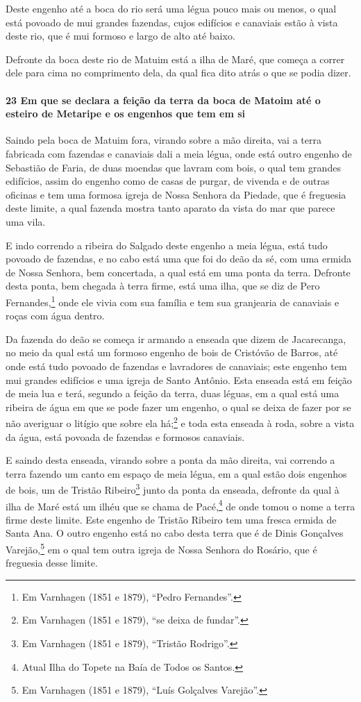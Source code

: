 Deste engenho até a boca do rio será uma légua pouco mais ou menos, o qual está povoado de
mui grandes fazendas, cujos edifícios e canaviais estão à vista deste rio, que é mui
formoso e largo de alto até baixo.

Defronte da boca deste rio de Matuim está a ilha de Maré, que começa a correr dele para
cima no comprimento dela, da qual fica dito atrás o que se podia dizer.

\paragraph{23 Em que se declara a feição da terra da boca de Matoim até o esteiro de
Metaripe e os engenhos que tem em si}

Saindo pela boca de Matuim fora, virando sobre a mão direita, vai a terra fabricada com
fazendas e canaviais dali a meia légua, onde está outro engenho de Sebastião de Faria, de
duas moendas que lavram com bois, o qual tem grandes edifícios, assim do engenho como de
casas de purgar, de vivenda e de outras oficinas e tem uma formosa igreja de Nossa Senhora
da Piedade, que é freguesia deste limite, a qual fazenda mostra tanto aparato da vista do
mar que parece uma vila.

E indo correndo a ribeira do Salgado deste engenho a meia légua, está tudo povoado de
fazendas, e no cabo está uma que foi do deão da sé, com uma ermida de Nossa Senhora, bem
concertada, a qual está em uma ponta da terra. Defronte desta ponta, bem chegada à terra
firme, está uma ilha, que se diz de Pero Fernandes,\footnote{ Em Varnhagen (1851 e 1879),
``Pedro Fernandes''.} onde ele vivia com sua família e tem sua granjearia de canaviais e
roças com água dentro.

Da fazenda do deão se começa ir armando a enseada que dizem de Jacarecanga, no meio da
qual está um formoso engenho de bois de Cristóvão de Barros, até onde está tudo povoado de
fazendas e lavradores de canaviais; este engenho tem mui grandes edifícios e uma igreja de
Santo Antônio. Esta enseada está em feição de meia lua e terá, segundo a feição da terra,
duas léguas, em a qual está uma ribeira de água em que se pode fazer um engenho, o qual se
deixa de fazer por se não averiguar o litígio que sobre ela há;\footnote{ Em Varnhagen
(1851 e 1879), ``se deixa de fundar''.} e toda esta enseada à roda, sobre a vista da água,
está povoada de fazendas e formosos canaviais.

E saindo desta enseada, virando sobre a ponta da mão direita, vai correndo a terra fazendo
um canto em espaço de meia légua, em a qual estão dois engenhos de bois, um de Tristão
Ribeiro\footnote{ Em Varnhagen (1851 e 1879), ``Tristão Rodrigo''.} junto da ponta da
enseada, defronte da qual à ilha de Maré está um ilhéu que se chama de Pacé,\footnote{
Atual Ilha do Topete na Baía de Todos os Santos.} de onde tomou o nome a terra firme deste
limite. Este engenho de Tristão Ribeiro tem uma fresca ermida de Santa Ana. O outro
engenho está no cabo desta terra que é de Dinis Gonçalves Varejão,\footnote{ Em Varnhagen
(1851 e 1879), ``Luís Golçalves Varejão''.} em o qual tem outra igreja de Nossa Senhora do
Rosário, que é freguesia desse limite.

